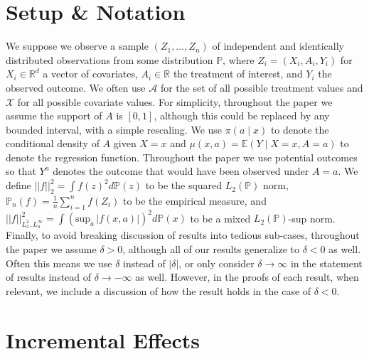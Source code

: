 \documentclass[11pt,twoside]{article}
\theoremstyle{definition}
\theoremstyle{remark}
\begin{document}
\section{Setup \& Notation} \label{notation_section}

We suppose we observe a sample $(Z_1, \ldots, Z_n)$ of independent and identically distributed observations from some distribution $\mathbb{P}$, where $Z_i = (X_i, A_i, Y_i)$ for $X_i \in \mathbb{R}^d$ a vector of covariates, $A_i \in \mathbb{R}$ the treatment of interest, and $Y_i$ the observed outcome. We often use $\mathcal{A}$ for the set of all possible treatment values and $\mathcal{X}$ for all possible covariate values. For simplicity, throughout the paper we assume the support of $A$ is $[0, 1]$, although this could be replaced by any bounded interval, with a simple rescaling. We use $\pi(a \mid x)$ to denote the conditional density of $A$ given $X = x$ and $\mu(x, a) = \mathbb{E}(Y \mid X=x, A=a)$ to denote the regression function. Throughout the paper we use potential outcomes so that $Y^a$ denotes the outcome that would have been observed under $A = a$. We define $||f||^2_2 = \int f(z)^2 d \mathbb{P}(z)$ to be the squared $L_2(\mathbb{P})$ norm, $\mathbb{P}_n(f) = \frac{1}{n} \sum^n_{i=1} f(Z_i)$ to be the empirical measure, and $ ||f||^2_{L^2_x, L^\infty_a} = \int  (\text{sup}_a  \, | f(x, a) | )^2 d \mathbb{P}(x)$ to be a mixed $L_2(\mathbb{P})$-sup norm. Finally, to avoid breaking discussion of results into tedious sub-cases, throughout the paper we assume $\delta > 0$, although all of our results generalize to $\delta < 0$ as well. Often this means we use $\delta$ instead of $|\delta|$, or only consider $\delta \to \infty$ in the statement of results instead of $\delta \to -\infty$ as well. However, in the proofs of each result, when relevant, we include a discussion of how the result holds in the case of $\delta < 0$.


\section{Incremental Effects} \label{incremental_effects_section}
\end{document}
